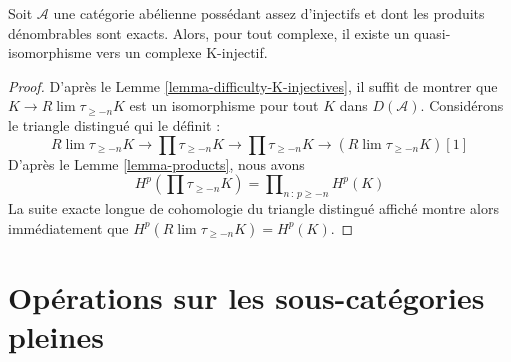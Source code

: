 \begin{lemma}
\label{lemma-enough-K-injectives-Ab4-star}
Soit $\mathcal{A}$ une catégorie abélienne possédant assez d'injectifs et dont
les produits dénombrables sont exacts. Alors, pour tout complexe, il existe un
quasi-isomorphisme vers un complexe K-injectif.
\end{lemma}

\begin{proof}
D'après le Lemme \ref{lemma-difficulty-K-injectives}, il suffit de montrer que
$K \to R\lim\tau_{\geq -n}K$ est un isomorphisme pour tout $K$ dans
$D(\mathcal{A})$. Considérons le triangle distingué qui le définit :
$$
R\lim\tau_{\geq -n}K \to
\prod \tau_{\geq -n}K \to
\prod \tau_{\geq -n}K \to
(R\lim\tau_{\geq -n}K)[1]
$$
D'après le Lemme \ref{lemma-products}, nous avons
$$
H^p(\prod \tau_{\geq -n}K) =
\prod\nolimits_{n\,:\,p \geq -n} H^p(K)
$$
La suite exacte longue de cohomologie du triangle distingué affiché montre
alors immédiatement que $H^p(R\lim \tau_{\geq -n}K) = H^p(K)$.
\end{proof}

\section{Opérations sur les sous-catégories pleines}
\label{section-operate-on-full}

